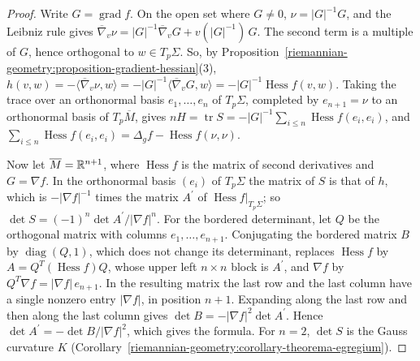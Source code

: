 \begin{proof}
Write $G = \operatorname{grad}f$. On the open set where $G \neq 0$, $\nu = |G|^{-1}G$, and the Leibniz rule gives $\overline{\nabla}_v\nu = |G|^{-1}\overline{\nabla}_vG + v(|G|^{-1})\,G$. The second term is a
multiple of $G$, hence orthogonal to $w \in T_p\Sigma$. So, by Proposition~\ref{riemannian-geometry:proposition-gradient-hessian}(3),
$h(v, w) = -\langle\overline{\nabla}_v\nu, w\rangle = -|G|^{-1}\langle\overline{\nabla}_vG, w\rangle = -|G|^{-1}\operatorname{Hess}f(v, w)$. Taking the trace over an orthonormal basis $e_1, \ldots, e_n$ of $T_p\Sigma$,
completed by $e_{n+1} = \nu$ to an orthonormal basis of $T_p\overline{M}$, gives $nH = \operatorname{tr}S = -|G|^{-1}\sum_{i \leq n}\operatorname{Hess}f(e_i, e_i)$, and
$\sum_{i \leq n}\operatorname{Hess}f(e_i, e_i) = \Delta_gf - \operatorname{Hess}f(\nu, \nu)$.

Now let $\overline{M} = \mathbb{R}^{n+1}$, where $\operatorname{Hess}f$ is the matrix of second derivatives and $G = \nabla f$. In the orthonormal basis $(e_i)$ of $T_p\Sigma$ the matrix of $S$ is that of $h$, which is
$-|\nabla f|^{-1}$ times the matrix $A^{\prime}$ of $\operatorname{Hess}f|_{T_p\Sigma}$; so $\det S = (-1)^n\det A^{\prime}/|\nabla f|^n$. For the bordered determinant, let $Q$ be the orthogonal matrix with
columns $e_1, \ldots, e_{n+1}$. Conjugating the bordered matrix $B$ by $\operatorname{diag}(Q, 1)$, which does not change its determinant, replaces $\operatorname{Hess}f$ by $A = Q^T(\operatorname{Hess}f)Q$, whose upper left
$n \times n$ block is $A^{\prime}$, and $\nabla f$ by $Q^T\nabla f = |\nabla f|\,e_{n+1}$. In the resulting matrix the last row and the last column have a single nonzero entry $|\nabla f|$, in position
$n + 1$. Expanding along the last row and then along the last column gives $\det B = -|\nabla f|^2\det A^{\prime}$. Hence $\det A^{\prime} = -\det B/|\nabla f|^2$, which gives the formula. For $n = 2$, $\det S$
is the Gauss curvature $K$ (Corollary~\ref{riemannian-geometry:corollary-theorema-egregium}).
\end{proof}

